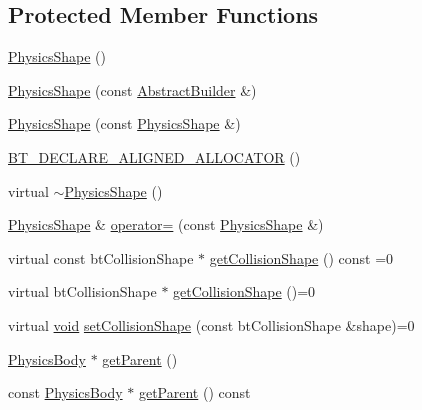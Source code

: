\subsection*{Protected Member Functions}
\begin{DoxyCompactItemize}
\item 
\mbox{\hyperlink{classnjli_1_1_physics_shape_a23c941342461cf9b8ea3a00f96e4b166}{Physics\+Shape}} ()
\item 
\mbox{\hyperlink{classnjli_1_1_physics_shape_ab15fa64eb27e24f04baa5ba707a9a030}{Physics\+Shape}} (const \mbox{\hyperlink{classnjli_1_1_abstract_builder}{Abstract\+Builder}} \&)
\item 
\mbox{\hyperlink{classnjli_1_1_physics_shape_a16a9abace510dc1886f82c09782d2976}{Physics\+Shape}} (const \mbox{\hyperlink{classnjli_1_1_physics_shape}{Physics\+Shape}} \&)
\item 
\mbox{\hyperlink{classnjli_1_1_physics_shape_a60e97b3ea2073db45dde247fd1c7d379}{B\+T\+\_\+\+D\+E\+C\+L\+A\+R\+E\+\_\+\+A\+L\+I\+G\+N\+E\+D\+\_\+\+A\+L\+L\+O\+C\+A\+T\+OR}} ()
\item 
virtual \mbox{\hyperlink{classnjli_1_1_physics_shape_a4bd97d3b6ff4c10b082cc228aec318b1}{$\sim$\+Physics\+Shape}} ()
\item 
\mbox{\hyperlink{classnjli_1_1_physics_shape}{Physics\+Shape}} \& \mbox{\hyperlink{classnjli_1_1_physics_shape_a7c29f1de36c1043e77c070626af242ab}{operator=}} (const \mbox{\hyperlink{classnjli_1_1_physics_shape}{Physics\+Shape}} \&)
\item 
virtual const bt\+Collision\+Shape $\ast$ \mbox{\hyperlink{classnjli_1_1_physics_shape_a527e956caca24bf16ed0d47f69ff14e8}{get\+Collision\+Shape}} () const =0
\item 
virtual bt\+Collision\+Shape $\ast$ \mbox{\hyperlink{classnjli_1_1_physics_shape_a2910f0362035c971f245349a55378b01}{get\+Collision\+Shape}} ()=0
\item 
virtual \mbox{\hyperlink{_thread_8h_af1e856da2e658414cb2456cb6f7ebc66}{void}} \mbox{\hyperlink{classnjli_1_1_physics_shape_a441e82a42f3b588a409c3b6c41288abd}{set\+Collision\+Shape}} (const bt\+Collision\+Shape \&shape)=0
\item 
\mbox{\hyperlink{classnjli_1_1_physics_body}{Physics\+Body}} $\ast$ \mbox{\hyperlink{classnjli_1_1_physics_shape_a060d12d9eabbed9aa1187580def44571}{get\+Parent}} ()
\item 
const \mbox{\hyperlink{classnjli_1_1_physics_body}{Physics\+Body}} $\ast$ \mbox{\hyperlink{classnjli_1_1_physics_shape_ad13001911fd2fe30b2eee35b883b6bbd}{get\+Parent}} () const
\end{DoxyCompactItemize}
